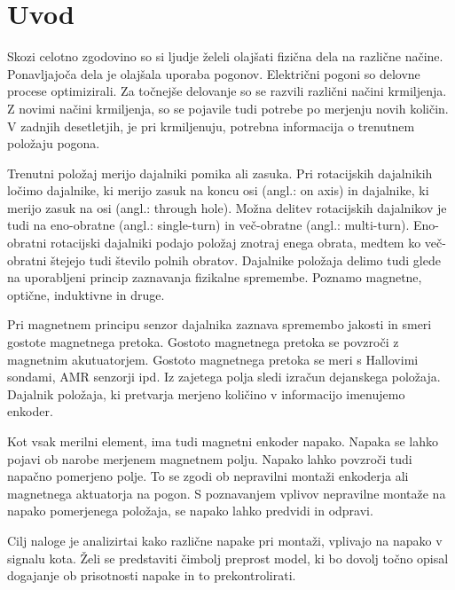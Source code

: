﻿\chapter{Uvod} \label{uvod}
Skozi celotno zgodovino so si ljudje želeli olajšati fizična dela na različne načine. Ponavljajoča dela je olajšala uporaba pogonov. Električni pogoni so delovne procese optimizirali.
Za točnejše delovanje so se razvili različni načini krmiljenja. Z novimi načini krmiljenja, so se pojavile tudi potrebe po merjenju novih količin. V zadnjih desetletjih, je pri krmiljenuju, potrebna informacija
o trenutnem položaju pogona.

Trenutni položaj merijo dajalniki pomika ali zasuka\cite{uporabaSenzorjev}. Pri rotacijskih dajalnikih ločimo dajalnike, ki merijo zasuk na koncu osi (angl.: on axis) in dajalnike, ki merijo zasuk na osi (angl.: through hole).
Možna delitev rotacijskih dajalnikov je tudi na eno-obratne (angl.: single-turn) in več-obratne (angl.: multi-turn). Eno-obratni rotacijski dajalniki podajo položaj znotraj enega obrata, medtem ko več-obratni
štejejo tudi število polnih obratov. Dajalnike položaja delimo tudi glede na uporabljeni princip zaznavanja fizikalne
spremembe. Poznamo magnetne, optične, induktivne in druge\cite{killer}.

Pri magnetnem principu senzor dajalnika zaznava spremembo jakosti in smeri
gostote magnetnega pretoka. 
Gostoto magnetnega pretoka se povzroči z magnetnim akutuatorjem. Gostoto magnetnega pretoka se meri s Hallovimi sondami, AMR senzorji ipd.
Iz zajetega polja sledi izračun dejanskega položaja. Dajalnik položaja, ki pretvarja merjeno količino v informacijo imenujemo enkoder\cite{enkoder}.

Kot vsak merilni element, ima tudi magnetni enkoder napako. Napaka se lahko pojavi ob narobe merjenem magnetnem polju\cite{RLS3}. Napako lahko povzroči tudi napačno pomerjeno polje.
To se zgodi ob nepravilni montaži enkoderja ali magnetnega aktuatorja na pogon. S poznavanjem vplivov nepravilne montaže na napako pomerjenega položaja, se napako lahko predvidi in odpravi.

Cilj naloge je analizirtai kako različne napake pri montaži, vplivajo na napako v signalu kota.
Želi se predstaviti čimbolj preprost model, ki bo dovolj točno opisal dogajanje ob prisotnosti napake in to prekontrolirati.

